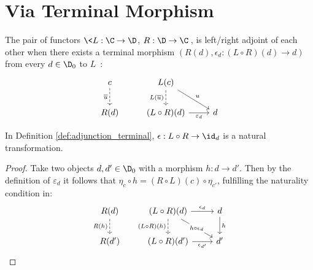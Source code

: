 \section{Via Terminal Morphism}

\begin{definition}
  The pair of functors $\<L: \C\to \D$, $R: \D\to \C\>$, is left/right adjoint
  of each other when there exists a terminal morphism $(R(d), \epsilon_d:
  (L\circ R)(d) \to d)$ from every $d\in \D_0$ to
  $L$~\parencite[p.~214]{awodey:category_theory}:
  \[\begin{tikzcd}[ampersand replacement=\&]
    c \& {L(c)} \\
    {R(d)} \& {(L\circ R)(d)} \& d
    \arrow["{\overline{u}}"', dashed, from=1-1, to=2-1]
    \arrow["{L(\overline{u})}"', dashed, from=1-2, to=2-2]
    \arrow["{\varepsilon_d}"', from=2-2, to=2-3]
    \arrow["u", from=1-2, to=2-3]
  \end{tikzcd}\]
\end{definition}

\begin{theorem}
  In Definition \ref{def:adjunction_terminal}, $\epsilon: L\circ R \to \id_d$
  is a natural transformation.

  \begin{proof}
    Take two objects $d,d'\in \D_0$ with a morphism $h:d\to d'$. Then by the
    definition of $\varepsilon_{d}$ it follows that $\eta_c\circ h = (R\circ
    L)(c)\circ \eta_{c'}$, fulfilling the naturality condition in:
    \[\begin{tikzcd}[ampersand replacement=\&]
      {R(d)} \& {(L\circ R)(d)} \& d \\
      {R(d')} \& {(L\circ R)(d')} \& {d'}
      \arrow["h", from=1-3, to=2-3]
      \arrow["{R(h)}"', dashed, from=1-1, to=2-1]
      \arrow["{\epsilon_d}", from=1-2, to=1-3]
      \arrow["{\epsilon_{d'}}"', from=2-2, to=2-3]
      \arrow["{h\circ\epsilon_d}"{description}, from=1-2, to=2-3]
      \arrow["{(L\circ R)(h)}"', dashed, from=1-2, to=2-2]
    \end{tikzcd}\]
  \end{proof}
\end{theorem}

